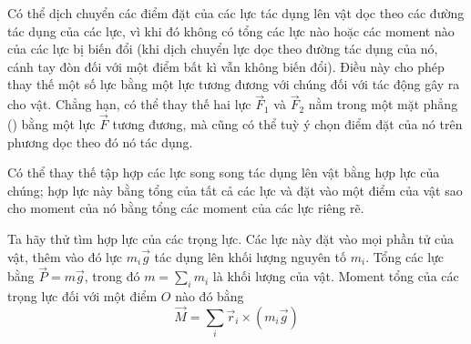 Có thể dịch chuyển các điểm đặt của các lực tác dụng lên vật dọc theo các đường tác dụng của các lực, vì khi đó không có tổng các lực nào hoặc các moment nào của các lực bị biến đổi (khi dịch chuyển lực dọc theo đường tác dụng của nó, cánh tay đòn đối với một điểm bất kì vẫn không biến đổi). Điều này cho phép thay thế một số lực bằng một lực tương đương với chúng đối với tác động gây ra cho vật. Chẳng hạn, có thể thay thế hai lực $\vec{F}_1$ và $\vec{F}_2$ nằm trong một mặt phẳng () bằng một lực $\vec{F}$ tương đương, mà cũng có thể tuỳ ý chọn điểm đặt của nó trên phương dọc theo đó nó tác dụng.

Có thể thay thế tập hợp các lực song song tác dụng lên vật bằng hợp lực của chúng; hợp lực này bằng tổng của tất cả các lực và đặt vào một điểm của vật sao cho moment của nó bằng tổng các moment của các lực riêng rẽ.

Ta hãy thử tìm hợp lực của các trọng lực. Các lực này đặt vào mọi phần tử của vật, thêm vào đó lực $m_i\vec{g}$ tác dụng lên khối lượng nguyên tố $m_i$. Tổng các lực bằng $\vec{P}=m\vec{g}$, trong đó $m=\sum_im_i$ là khối lượng của vật. Moment tổng của các trọng lực đối với một điểm $O$ nào đó bằng
\begin{equation*}
	\vec{M} = \sum_i \vec{r}_i \times (m_i \vec{g})
\end{equation*}

